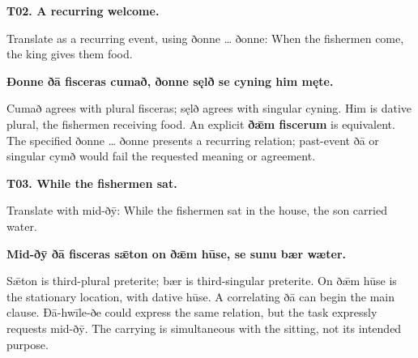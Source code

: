 \par\begin{minipage}{\linewidth}\raggedright
\textbf{T02. A recurring welcome.}

Translate as a recurring event, using ðonne … ðonne: When the fishermen come, the king gives them food.

\textbf{Ðonne ðā fisceras cumað, ðonne sęlð se cyning him męte.}

Cumað agrees with plural fisceras; sęlð agrees with singular cyning. Him is dative plural, the fishermen receiving food. An explicit \textbf{ðǣm fiscerum} is equivalent. The specified ðonne … ðonne presents a recurring relation; past-event ðā or singular cymð would fail the requested meaning or agreement.

\end{minipage}\par\addvspace{4pt}

\par\begin{minipage}{\linewidth}\raggedright
\textbf{T03. While the fishermen sat.}

Translate with mid-ðȳ: While the fishermen sat in the house, the son carried water.

\textbf{Mid-ðȳ ðā fisceras sǣton on ðǣm hūse, se sunu bær wæter.}

Sǣton is third-plural preterite; bær is third-singular preterite. On ðǣm hūse is the stationary location, with dative hūse. A correlating ðā can begin the main clause. Ðā-hwīle-ðe could express the same relation, but the task expressly requests mid-ðȳ. The carrying is simultaneous with the sitting, not its intended purpose.

\end{minipage}\par\addvspace{4pt}

